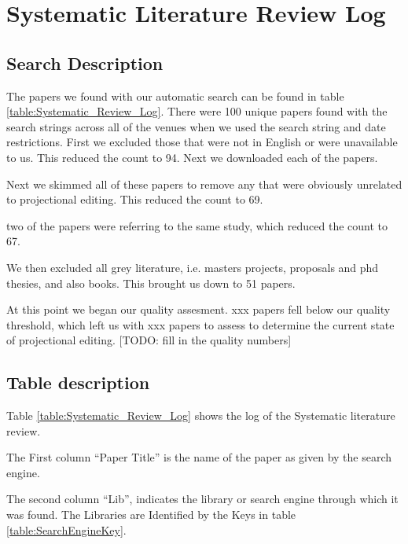 \chapter{Systematic Literature Review Log} \label{Appendix:SLRLog}

\section{Search Description} 
The papers we found with our automatic search can be found in table \ref{table:Systematic_Review_Log}.
There were 100 unique papers found with the search strings across all of the venues when we used the search string and date restrictions.  
First we excluded those that were not in English or were unavailable to us.
This reduced the count to 94.
Next we downloaded each of the papers. 

Next we skimmed all of these papers to remove any that were obviously unrelated to projectional editing.
This reduced the count to 69.

two of the papers were referring to the same study, which reduced the count to 67.

We then excluded all grey literature, i.e. masters projects, proposals and phd thesies, and also books.
This brought us down to 51 papers.

At this point we began our quality assesment.
xxx papers fell below our quality threshold, which left us with xxx papers to assess to determine the current state of projectional editing.
[TODO: fill in the quality numbers]

\section{Table description}
Table \ref{table:Systematic_Review_Log} shows the log of the Systematic literature review.

The First column ``Paper Title'' is the name of the paper as given by the search engine.

The second column ``Lib'', indicates the library or search engine through which it was found.  
The Libraries are Identified by the Keys in table \ref{table:SearchEngineKey}.


